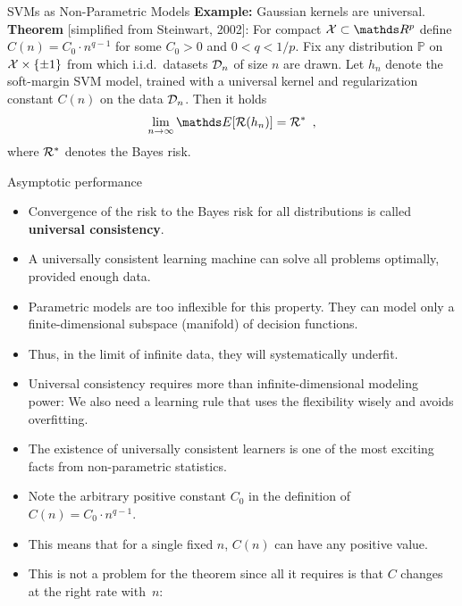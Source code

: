 \documentclass[11pt,compress,t,notes=noshow, xcolor=table]{beamer}
\begin{document}
\begin{vbframe}{SVMs as Non-Parametric Models}
  \textbf{Example:} Gaussian kernels are universal.\\[1em]

  \textbf{Theorem} [simplified from Steinwart, 2002]:
  For compact $\Xspace \subset \R^p$ define $C(n) = C_0 \cdot n^{q - 1}$
  for some $C_0 > 0$ and $0 < q < 1/p$. Fix any distribution $\mathbb{P}$ on
  $\mathcal{X} \times \{\pm 1\}$ from which i.i.d.\ datasets $\mathcal{D}_n$ of size
  $n$ are drawn. Let $h_n$ denote the soft-margin SVM model,
  trained with a universal kernel and regularization constant $C(n)$
  on the data $\mathcal{D}_n$. Then it holds
  $$
    \lim_{n \to \infty} \E[\risk(h_n)] = \risk^*
    \enspace,
  $$
  where $\mathcal{R}^*$ denotes the Bayes risk.

\end{vbframe}

\begin{vbframe}{Asymptotic performance}

  \begin{itemize}
    \item Convergence of the risk to the Bayes risk for all distributions
    is called \textbf{universal consistency}.
    \item A universally consistent learning machine can solve all problems
    optimally, provided enough data.
    \item Parametric models are too inflexible for this property. They
    can model only a finite-dimensional subspace (manifold) of
    decision functions.
    \item Thus, in the limit of infinite data, they will systematically
    underfit.
    \item Universal consistency requires more than infinite-dimensional
    modeling power: We also need a learning rule that uses the
    flexibility wisely and avoids overfitting.
    \item The existence of universally consistent learners is one of the
    most exciting facts from non-parametric statistics.
  \end{itemize}

  \framebreak

  \begin{itemize}
    \item Note the arbitrary positive constant $C_0$ in the definition
    of $C(n) = C_0 \cdot n^{q - 1}$.
    \item This means that for a single fixed $n$, $C(n)$ can have
    any positive value.
    \item This is not a problem for the theorem since all it requires is that
    $C$ changes at the right rate with~$n$:


\end{itemize}
\end{vbframe}
\end{document}
